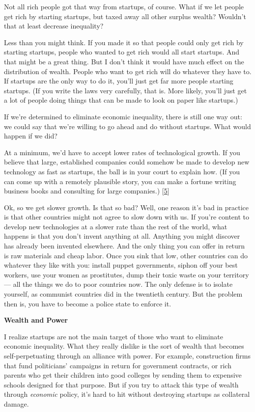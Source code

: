 Not all rich people got that way from startups, of course. What if we
let people get rich by starting startups, but taxed away all other
surplus wealth? Wouldn't that at least decrease inequality?

Less than you might think. If you made it so that people could only get
rich by starting startups, people who wanted to get rich would all start
startups. And that might be a great thing. But I don't think it would
have much effect on the distribution of wealth. People who want to get
rich will do whatever they have to. If startups are the only way to do
it, you'll just get far more people starting startups. (If you write the
laws very carefully, that is. More likely, you'll just get a lot of
people doing things that can be made to look on paper like startups.)

If we're determined to eliminate economic inequality, there is still one
way out: we could say that we're willing to go ahead and do without
startups. What would happen if we did?

At a minimum, we'd have to accept lower rates of technological growth.
If you believe that large, established companies could somehow be made
to develop new technology as fast as startups, the ball is in your court
to explain how. (If you can come up with a remotely plausible story, you
can make a fortune writing business books and consulting for large
companies.) {[}\hyperref[f5n]{5}{]}

Ok, so we get slower growth. Is that so bad? Well, one reason it's bad
in practice is that other countries might not agree to slow down with
us. If you're content to develop new technologies at a slower rate than
the rest of the world, what happens is that you don't invent anything at
all. Anything you might discover has already been invented elsewhere.
And the only thing you can offer in return is raw materials and cheap
labor. Once you sink that low, other countries can do whatever they like
with you: install puppet governments, siphon off your best workers, use
your women as prostitutes, dump their toxic waste on your territory ---
all the things we do to poor countries now. The only defense is to
isolate yourself, as communist countries did in the twentieth century.
But the problem then is, you have to become a police state to enforce
it.

\textbf{Wealth and Power}

I realize startups are not the main target of those who want to
eliminate economic inequality. What they really dislike is the sort of
wealth that becomes self-perpetuating through an alliance with power.
For example, construction firms that fund politicians' campaigns in
return for government contracts, or rich parents who get their children
into good colleges by sending them to expensive schools designed for
that purpose. But if you try to attack this type of wealth through
\emph{economic} policy, it's hard to hit without destroying startups as
collateral damage.

